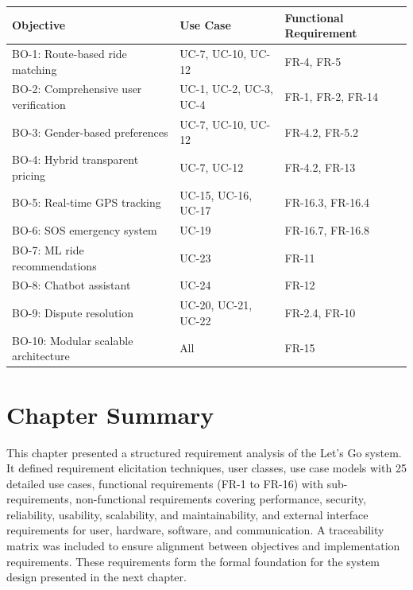 \begin{longtable}{|p{3cm}|p{3cm}|p{8cm}|}
\hline
\rowcolor{lightgray!30}
\textbf{Objective} & \textbf{Use Case} & \textbf{Functional Requirement} \\
\hline
BO-1: Route-based ride matching & UC-7, UC-10, UC-12 & FR-4, FR-5 \\
\hline
BO-2: Comprehensive user verification & UC-1, UC-2, UC-3, UC-4 & FR-1, FR-2, FR-14 \\
\hline
BO-3: Gender-based preferences & UC-7, UC-10, UC-12 & FR-4.2, FR-5.2 \\
\hline
BO-4: Hybrid transparent pricing & UC-7, UC-12 & FR-4.2, FR-13 \\
\hline
BO-5: Real-time GPS tracking & UC-15, UC-16, UC-17 & FR-16.3, FR-16.4 \\
\hline
BO-6: SOS emergency system & UC-19 & FR-16.7, FR-16.8 \\
\hline
BO-7: ML ride recommendations & UC-23 & FR-11 \\
\hline
BO-8: Chatbot assistant & UC-24 & FR-12 \\
\hline
BO-9: Dispute resolution & UC-20, UC-21, UC-22 & FR-2.4, FR-10 \\
\hline
BO-10: Modular scalable architecture & All & FR-15 \\
\hline
\end{longtable}

\section*{Chapter Summary}

This chapter presented a structured requirement analysis of the Let's Go system. It defined requirement elicitation techniques, user classes, use case models with 25 detailed use cases, functional requirements (FR-1 to FR-16) with sub-requirements, non-functional requirements covering performance, security, reliability, usability, scalability, and maintainability, and external interface requirements for user, hardware, software, and communication. A traceability matrix was included to ensure alignment between objectives and implementation requirements. These requirements form the formal foundation for the system design presented in the next chapter.

